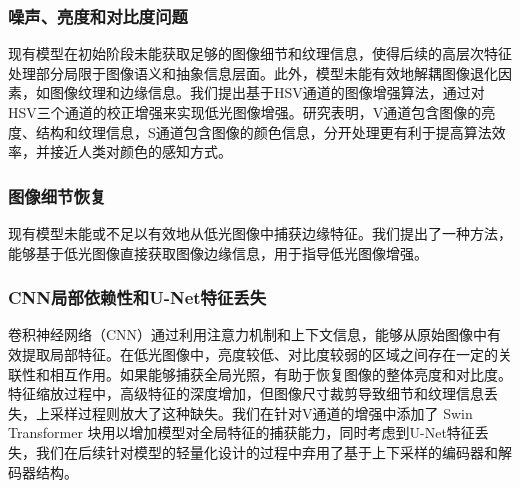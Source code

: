 \documentclass[a4paper]{ctexart}
\begin{document}
	
	\subsubsection{噪声、亮度和对比度问题}
	
	现有模型在初始阶段未能获取足够的图像细节和纹理信息，使得后续的高层次特征处理部分局限于图像语义和抽象信息层面。此外，模型未能有效地解耦图像退化因素，如图像纹理和边缘信息。我们提出基于HSV通道的图像增强算法，通过对HSV三个通道的校正增强来实现低光图像增强。研究表明，V通道包含图像的亮度、结构和纹理信息，S通道包含图像的颜色信息，分开处理更有利于提高算法效率，并接近人类对颜色的感知方式。
	
	\subsubsection{图像细节恢复}
	
	现有模型未能或不足以有效地从低光图像中捕获边缘特征。我们提出了一种方法，能够基于低光图像直接获取图像边缘信息，用于指导低光图像增强。
	
	\subsubsection{CNN局部依赖性和U-Net特征丢失}
	卷积神经网络（CNN）通过利用注意力机制\cite{yang2021locally,zhang2020attention}和上下文信息，能够从原始图像中有效提取局部特征\cite{jain1991unsupervised, lowe2004distinctive, ojala2002multiresolution}。在低光图像中，亮度较低、对比度较弱的区域之间存在一定的关联性和相互作用。如果能够捕获全局光照，有助于恢复图像的整体亮度和对比度\cite{chen2018learning, wang2013naturalness}。特征缩放过程中，高级特征的深度增加，但图像尺寸裁剪导致细节和纹理信息丢失，上采样过程则放大了这种缺失。我们在针对V通道的增强中添加了 Swin Transformer 块用以增加模型对全局特征的捕获能力，同时考虑到U-Net特征丢失，我们在后续针对模型的轻量化设计的过程中弃用了基于上下采样的编码器和解码器结构。
	
	
	
\end{document}
